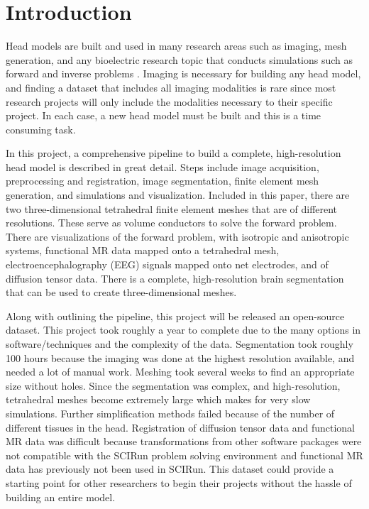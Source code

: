 
\section{Introduction}
\label{sec:intro}

Head models are built and used in many research areas such as imaging, mesh generation, and any bioelectric research topic that conducts simulations such as forward and inverse problems \cite{ref:Brette2012}. Imaging is necessary for building any head model, and finding a dataset that includes all imaging modalities is rare since most research projects will only include the modalities necessary to their specific project. In each case, a new head model must be built and this is a time consuming task.

In this project, a comprehensive pipeline to build a complete, high-resolution head model is described in great detail. Steps include image acquisition, preprocessing and registration, image segmentation, finite element mesh generation, and simulations and visualization. Included in this paper, there are two three-dimensional tetrahedral finite element meshes that are of different resolutions. These serve as volume conductors to solve the forward problem. There are visualizations of the forward problem, with isotropic and anisotropic systems, functional MR data mapped onto a tetrahedral mesh, electroencephalography (EEG) signals mapped onto net electrodes, and of diffusion tensor data. There is a complete, high-resolution brain segmentation that can be used to create three-dimensional meshes. 

Along with outlining the pipeline, this project will be released an open-source dataset. This project took roughly a year to complete due to the many options in software/techniques and the complexity of the data. Segmentation took roughly 100 hours because the imaging was done at the highest resolution available, and needed a lot of manual work. Meshing took several weeks to find an appropriate size without holes. Since the segmentation was complex, and high-resolution, tetrahedral meshes become extremely large which makes for very slow simulations. Further simplification methods failed because of the number of different tissues in the head. Registration of diffusion tensor data and functional MR data was difficult because transformations from other software packages were not compatible with the SCIRun problem solving environment \cite{ref:scirun} and functional MR data has previously not been used in SCIRun. This dataset could provide a starting point for other researchers to begin their projects without the hassle of building an entire model. 